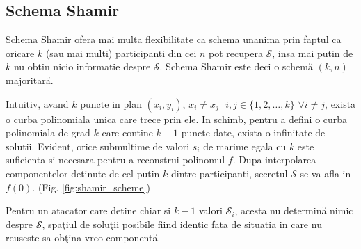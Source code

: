 \documentclass{llncs}
\begin{document}



\subsection{Schema Shamir}

Schema Shamir ofera mai multa flexibilitate ca schema unanima prin faptul ca oricare $k$ (sau mai multi) participanti
din cei $n$ pot recupera $\mathcal{S}$, insa mai putin de $k$ nu obtin nicio informatie despre $\mathcal{S}$. Schema Shamir este deci o schem\u{a} $(k,n)$ majoritar\u{a}.

Intuitiv, avand $k$ puncte in plan $(x_i, y_i)$, $x_i \neq x_j \text{ } i,j \in \{1,2,\dots,k\}$ $\forall i \neq j$, exista o curba polinomiala unica care trece prin ele.  
In schimb, pentru a defini o curba polinomiala de grad $k$ care contine $k - 1$ puncte date, exista o infinitate de solutii.
Evident, orice submultime de valori $s_i$ de marime egala cu $k$ este suficienta si necesara pentru a reconstrui polinomul $f$. Dupa interpolarea componentelor detinute de cel putin $k$ dintre participanti, secretul $\mathcal{S}$ se va afla in $f(0)$. (Fig. \ref{fig:shamir_scheme}) 

Pentru un atacator care detine chiar si $k-1$ valori $\mathcal{S}_i$, acesta nu determin\u{a} nimic despre $\mathcal{S}$, spa\c{t}iul de solu\c{t}ii posibile fiind identic fata de situatia in care nu reuseste sa ob\c{t}ina vreo component\u{a}.
\end{document}
